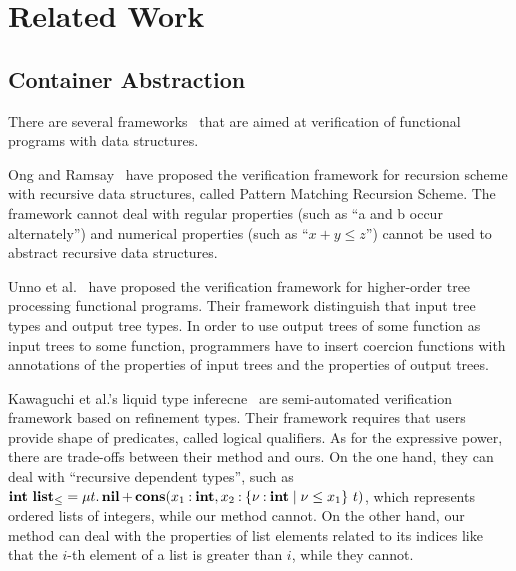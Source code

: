 \section{Related Work}
\label{sec:related}

\subsection{Container Abstraction}
There are several
frameworks~\cite{Kawaguchi2009,Chin2003,Unno2010,Ong2011} that are aimed at
verification of functional programs with data structures.

Ong and Ramsay~\cite{Ong2011} have proposed the verification framework
for recursion scheme with recursive data structures, called Pattern
Matching Recursion Scheme.  The framework
cannot deal with regular properties (such as ``a and b occur
alternately'') and numerical properties (such as ``$x+y \leq z$'') cannot be used
to abstract recursive data structures.

Unno et al.~\cite{Unno2010} have proposed the verification framework for higher-order
tree processing functional programs. Their framework distinguish that
input tree types and output tree types.  In order to use output trees of
some function as input trees to some function, programmers have to
insert coercion functions with annotations of the properties of input
trees and the properties of output trees.

Kawaguchi et al.'s liquid type inferecne~\cite{Kawaguchi2009} are
semi-automated verification framework based on refinement types.  Their
framework requires that users provide shape of predicates, called
logical qualifiers.  As for the expressive power, there are trade-offs
between their method and ours.  On the one hand, they can deal with
``recursive dependent types'', such as ${\mathbf{int}}~{\mathbf{list}_\leq} = \mu{t}.\, {
\mathbf{nil} \mathop{+} \mathbf{cons}({x_1\mathbin{:}\mathbf{int}},{x_2\mathbin{:}{\{\nu\mathbin{:}\mathbf{int} \mid \nu \leq
x_1\}}~{t}})}$, which represents ordered lists of integers, while our
method cannot. On the other hand, our method can deal with the
properties of list elements related to its indices like that the $i$-th
element of a list is greater than $i$, while they cannot.


